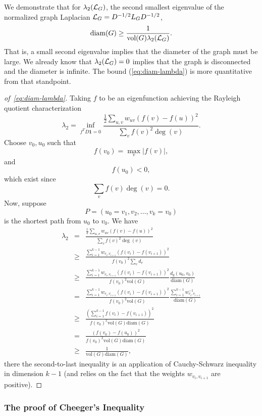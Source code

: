 We demonstrate that for $\lambda_2(\mathcal{L}_G)$, the second smallest eigenvalue of
the normalized graph Laplacian $\mathcal{L}_G = D^{-1/2}L_G D^{-1/2}$,
\begin{equation}
\label{eq:diam-lambda}
\text{diam}(G) \geq \frac{
1}{\text{vol}(G)\lambda_2(\mathcal{L}_G)}.
\end{equation}
That is, a small second eigenvalue implies that the diameter of the graph must be large. We already know that $\lambda_2(\mathcal{L}_G) = 0$ implies that the graph is disconnected and the diameter is infinite. The bound (\ref{eq:diam-lambda}) is more quantitative from that standpoint.

\smallskip
\begin{proof}[of~\eqref{eq:diam-lambda}] Taking $f$ to be an eigenfunction achieving the Rayleigh quotient
characterization $$\lambda_2=\inf_{f^T D\mathbf{1}=0}
\frac{\frac{1}{2}\sum_{u,v} w_{uv}(f(v)-f(u))^2}{\sum_{v} f(v)^2 \deg(v)}.$$
Choose $v_0, u_0$ such that $$f(v_0)=\max_v |f(v)|,$$ and $$f(u_0)<0,$$
which exist since
$$\sum_{v} f(v)\deg(v)=0.$$ Now, suppose $$P=(u_0=v_1,v_2,\ldots,v_k=v_0)$$ is the shortest path
from $u_0$ to $v_0$. We have
\begin{eqnarray*}
\lambda_2 &=& \frac{\frac{1}{2}\sum_{u,v} w_{uv}(f(v)-f(u))^2}{\sum_{v} f(v)^2 \deg(v)} \\
&\geq&
 \frac{\sum_{i=1}^{k-1}
w_{v_i,v_{i+1}}(f(v_i)-f(v_{i+1}))^2}{f(v_0)^2\sum_{v} d_v} \\
& \geq & \frac{\sum_{i=1}^{k-1}
w_{v_i,v_{i+1}}(f(v_i)-f(v_{i+1}))^2}{f(v_0)^2\text{vol}(G)} \frac{d_g(u_0,v_0)}{\text{diam}(G)} \\
&=& \frac{\sum_{i=1}^{k-1}
w_{v_i,v_{i+1}}(f(v_i)-f(v_{i+1}))^2}{f(v_0)^2\text{vol}(G)} \frac{\sum_{i=1}^{k-1} w_{v_i,v_{i+1}}^{-1}}{\text{diam}(G)} \\
&\geq& \frac{\left(\sum_{i=1}^{k-1}
f(v_i)-f(v_{i+1})\right)^2}{f(v_0)^2\text{vol}(G)\text{diam}(G)} \\
&=& \frac{(
f(v_0)-f(u_0))^2}{f(v_0)^2\text{vol}(G)\text{diam}(G)} \\
&\geq& \frac{
1}{\text{vol}(G)\text{diam}(G)},
\end{eqnarray*}
there the second-to-last inequality is an application of Cauchy-Schwarz inequality in dimension $k-1$ (and relies on the fact that the weights $w_{v_i,v_{i+1}}$ are positive).
\end{proof}

\subsubsection{The proof of Cheeger's Inequality}

